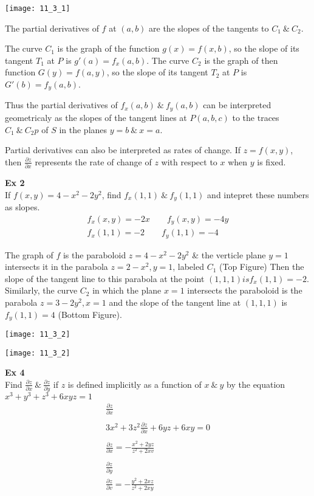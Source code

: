 \documentclass{article}
\begin{document}
  \begin{center}
    \texttt{[image: 11\_3\_1]}
  \end{center}
  The partial derivatives of $ f $ at $ (a,b) $ are the slopes of the tangents to $ C_1 ~\&~ C_2 $.

  The curve $ C_1 $ is the graph of the function $ g(x) = f(x,b) $, so the slope of its tangent $ T_1 $ at $ P $ is $ g'(a)=f_x(a,b) $. The curve $ C_2 $ is the graph of then function $ G(y)=f(a,y) $, so the slope of its tangent $ T_2 $ at $ P $ is $ G'(b)=f_y(a,b) $.

  Thus the partial derivatives of $ f_x(a,b) ~\&~ f_y(a,b) $ can be interpreted geometricaly as the slopes of the tangent lines at $ P(a,b,c) $ to the traces $ C_1 ~\&~ C_2 p $ of $ S $ in the planes $ y=b ~\&~ x=a $.

  Partial derivatives can also be interpreted as rates of change. If $ z=f(x,y) $, then $ \frac{\partial z}{\partial x} $ represents the rate of change of $ z $ with respect to $ x $ when $ y $ is fixed.

  \textbf{Ex 2}\\
  If $ f(x,y) = 4-x^{2} - 2y^{2} $, find $ f_x(1,1) ~\&~ f_y(1,1) $ and intepret these numbers as slopes.
  \[
    \begin{gathered}
    f_x(x,y) = -2x \qquad f_y(x,y)=-4y\\
    f_x(1,1)=-2  \qquad f_y(1,1)=-4
    \end{gathered}
  \]

  The graph of $ f $ is the paraboloid $ z=4-x^{2}-2y^{2} $ \& the verticle plane $ y=1 $ intersects it in the parabola $ z=2-x^{2},y=1 $, labeled $ C_1 $ (Top Figure) Then the slope of the tangent line to this parabola at the point $ (1,1,1) is f_x(1,1)=-2 $. Similarly, the curve $ C_2 $ in which the plane $ x=1 $ intersects the paraboloid is the parabola $ z=3-2y^{2},x=1 $ and the slope of the tangent line at $ (1,1,1) $ is $ f_y(1,1)=4 $ (Bottom Figure).
  \begin{center}
    \texttt{[image: 11\_3\_2]}
  \end{center}
  \begin{center}
    \texttt{[image: 11\_3\_2]}
  \end{center}
  
  \textbf{Ex 4}\\
Find $ \frac{\partial z}{\partial x} ~\&~ \frac{\partial z}{\partial y} $ if $ z $ is defined implicitly as a function of $ x ~\&~ y $ by the equation $ x^{3}+y^{3}+z^{3}+6xyz=1 $ 
 \[
   \begin{gathered}
   \frac{\partial z}{\partial x}\\
   ~\\
   3x^{2}+3z^{2}\frac{\partial z}{\partial x}+6yz+6xy=0\\
   ~\\
   \frac{\partial z}{\partial x}=-\frac{x^{2}+2yz}{z^{2}+2xv}\\
   ~\\
   \frac{\partial z}{\partial y}\\
   \frac{\partial z}{\partial v}=-\frac{y^{2}+2xz}{z^{2}+2xy}
   \end{gathered}
 \] 
\end{document}
